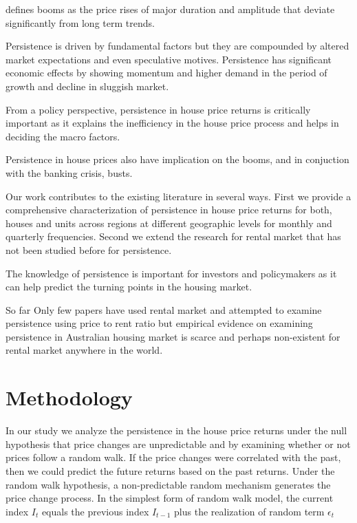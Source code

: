 \documentclass[AEJ,reqno, draftmode]{AEA}
\begin{document}
\citet{AGNELLO2011171} defines booms as the price rises of major duration and amplitude that deviate significantly from long term trends. 

Persistence is driven by fundamental factors but they are compounded by altered market expectations and even speculative motives. Persistence has significant economic effects by showing momentum and higher demand in the period of growth and decline in sluggish market.

From a policy perspective, persistence in house price returns is critically important as it explains the inefficiency in the house price process and helps in deciding the macro factors.
\citep{AGNELLO2011171}

Persistence in house prices also have implication on the booms, and in conjuction with the banking crisis, busts. 


Our work contributes to the existing literature in several ways. First we provide a comprehensive characterization of persistence in house price returns for both, houses and units across regions at different geographic levels for monthly and quarterly frequencies. Second we extend the research for rental market that has not been studied before for persistence.

The knowledge of persistence is important for investors and policymakers as it can help predict the turning points in the housing market.


So far Only few papers have used rental market and attempted to examine persistence using price to rent ratio but empirical evidence on examining persistence in Australian housing market is scarce and perhaps non-existent for rental market anywhere in the world.
 



















\section{Methodology}



In our study we analyze the persistence in the house price returns under the null hypothesis that price changes are unpredictable and by examining whether or not prices follow a random walk. If the price changes were correlated with the past, then we could predict the future returns based on the past returns. Under the random walk hypothesis, a non-predictable random mechanism generates the price change process. In the simplest form of random walk model, the current index $I_t$ equals the previous index $I_{t-1}$ plus the realization of random term $\epsilon_t$
\end{document}
